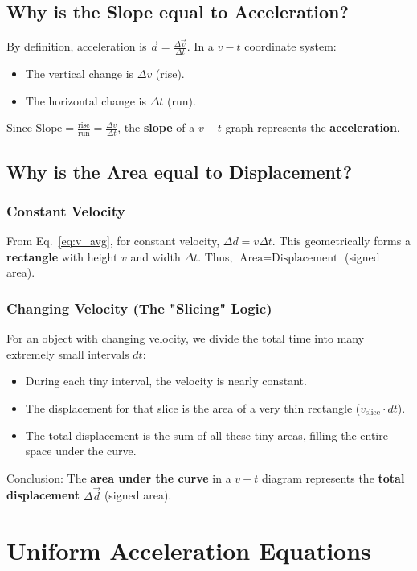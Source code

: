\documentclass{article}
\begin{document}
\subsection{Why is the Slope equal to Acceleration?}
By definition, acceleration is $\vec{a} = \frac{\Delta \vec{v}}{\Delta t}$. In a $v-t$ coordinate system:
\begin{itemize}
  \item The vertical change is $\Delta v$ (rise).
  \item The horizontal change is $\Delta t$ (run).
\end{itemize}
Since $\text{Slope} = \frac{\text{rise}}{\text{run}} = \frac{\Delta v}{\Delta t}$, the \textbf{slope} of a $v-t$ graph represents the \textbf{acceleration}.

\subsection{Why is the Area equal to Displacement?}
\subsubsection*{Constant Velocity}
From Eq.~\eqref{eq:v_avg}, for constant velocity, $\Delta d = v \Delta t$. This geometrically forms a \textbf{rectangle} with height $v$ and width $\Delta t$. Thus, $\text{Area} = \text{Displacement}$ (signed area).

\subsubsection*{Changing Velocity (The "Slicing" Logic)}
For an object with changing velocity, we divide the total time into many extremely small intervals $dt$:
\begin{itemize}
  \item During each tiny interval, the velocity is nearly constant.
  \item The displacement for that slice is the area of a very thin rectangle ($v_{\text{slice}} \cdot dt$).
  \item The total displacement is the sum of all these tiny areas, filling the entire space under the curve.
\end{itemize}
Conclusion: The \textbf{area under the curve} in a $v-t$ diagram represents the \textbf{total displacement} $\Delta \vec{d}$ (signed area).

\newpage
\section{Uniform Acceleration Equations}
\end{document}
